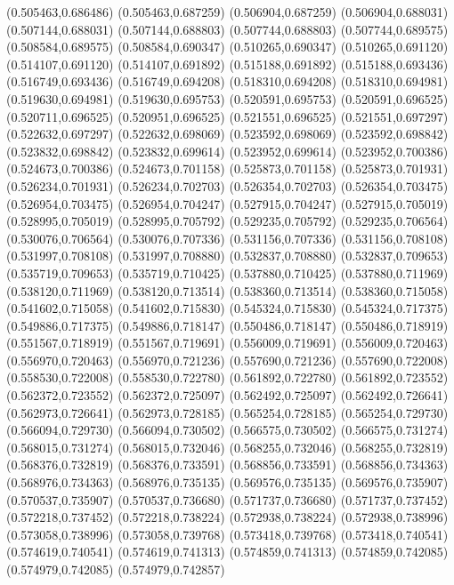 (0.505463,0.686486)
(0.505463,0.687259)
(0.506904,0.687259)
(0.506904,0.688031)
(0.507144,0.688031)
(0.507144,0.688803)
(0.507744,0.688803)
(0.507744,0.689575)
(0.508584,0.689575)
(0.508584,0.690347)
(0.510265,0.690347)
(0.510265,0.691120)
(0.514107,0.691120)
(0.514107,0.691892)
(0.515188,0.691892)
(0.515188,0.693436)
(0.516749,0.693436)
(0.516749,0.694208)
(0.518310,0.694208)
(0.518310,0.694981)
(0.519630,0.694981)
(0.519630,0.695753)
(0.520591,0.695753)
(0.520591,0.696525)
(0.520711,0.696525)
(0.520951,0.696525)
(0.521551,0.696525)
(0.521551,0.697297)
(0.522632,0.697297)
(0.522632,0.698069)
(0.523592,0.698069)
(0.523592,0.698842)
(0.523832,0.698842)
(0.523832,0.699614)
(0.523952,0.699614)
(0.523952,0.700386)
(0.524673,0.700386)
(0.524673,0.701158)
(0.525873,0.701158)
(0.525873,0.701931)
(0.526234,0.701931)
(0.526234,0.702703)
(0.526354,0.702703)
(0.526354,0.703475)
(0.526954,0.703475)
(0.526954,0.704247)
(0.527915,0.704247)
(0.527915,0.705019)
(0.528995,0.705019)
(0.528995,0.705792)
(0.529235,0.705792)
(0.529235,0.706564)
(0.530076,0.706564)
(0.530076,0.707336)
(0.531156,0.707336)
(0.531156,0.708108)
(0.531997,0.708108)
(0.531997,0.708880)
(0.532837,0.708880)
(0.532837,0.709653)
(0.535719,0.709653)
(0.535719,0.710425)
(0.537880,0.710425)
(0.537880,0.711969)
(0.538120,0.711969)
(0.538120,0.713514)
(0.538360,0.713514)
(0.538360,0.715058)
(0.541602,0.715058)
(0.541602,0.715830)
(0.545324,0.715830)
(0.545324,0.717375)
(0.549886,0.717375)
(0.549886,0.718147)
(0.550486,0.718147)
(0.550486,0.718919)
(0.551567,0.718919)
(0.551567,0.719691)
(0.556009,0.719691)
(0.556009,0.720463)
(0.556970,0.720463)
(0.556970,0.721236)
(0.557690,0.721236)
(0.557690,0.722008)
(0.558530,0.722008)
(0.558530,0.722780)
(0.561892,0.722780)
(0.561892,0.723552)
(0.562372,0.723552)
(0.562372,0.725097)
(0.562492,0.725097)
(0.562492,0.726641)
(0.562973,0.726641)
(0.562973,0.728185)
(0.565254,0.728185)
(0.565254,0.729730)
(0.566094,0.729730)
(0.566094,0.730502)
(0.566575,0.730502)
(0.566575,0.731274)
(0.568015,0.731274)
(0.568015,0.732046)
(0.568255,0.732046)
(0.568255,0.732819)
(0.568376,0.732819)
(0.568376,0.733591)
(0.568856,0.733591)
(0.568856,0.734363)
(0.568976,0.734363)
(0.568976,0.735135)
(0.569576,0.735135)
(0.569576,0.735907)
(0.570537,0.735907)
(0.570537,0.736680)
(0.571737,0.736680)
(0.571737,0.737452)
(0.572218,0.737452)
(0.572218,0.738224)
(0.572938,0.738224)
(0.572938,0.738996)
(0.573058,0.738996)
(0.573058,0.739768)
(0.573418,0.739768)
(0.573418,0.740541)
(0.574619,0.740541)
(0.574619,0.741313)
(0.574859,0.741313)
(0.574859,0.742085)
(0.574979,0.742085)
(0.574979,0.742857)
